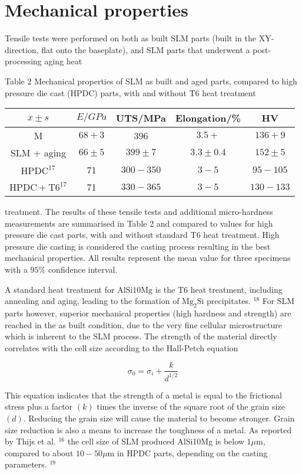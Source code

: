 \documentclass[10pt]{article}
\begin{document}
\section*{Mechanical properties}
Tensile tests were performed on both as built SLM parts (built in the XY-direction, flat onto the baseplate), and SLM parts that underwent a post-processing aging heat

Table 2 Mechanical properties of SLM as built and aged parts, compared to high pressure die cast (HPDC) parts, with and without T6 heat treatment

\begin{center}
\begin{tabular}{|c|c|c|c|c|}
\hline
$x \pm s$ & $E / G P a$ & UTS/MPa & Elongation/\% & HV \\
\hline
M & $68+3$ & 396 & $3.5+$ & $136+9$ \\
\hline
SLM + aging & $66 \pm 5$ & $399 \pm 7$ & $3.3 \pm 0.4$ & $152 \pm 5$ \\
\hline
$\mathrm{HPDC}^{17}$ & 71 & $300-350$ & $3-5$ & $95-105$ \\
\hline
$\mathrm{HPDC}+\mathrm{T} 6^{17}$ & 71 & $330-365$ & $3-5$ & $130-133$ \\
\hline
\end{tabular}
\end{center}

treatment. The results of these tensile tests and additional micro-hardness measurements are summarised in Table 2 and compared to values for high pressure die cast parts, with and without standard T6 heat treatment. High pressure die casting is considered the casting process resulting in the best mechanical properties. All results represent the mean value for three specimens with a $95 \%$ confidence interval.

A standard heat treatment for $\mathrm{AlSi} 10 \mathrm{Mg}$ is the $\mathrm{T} 6$ heat treatment, including annealing and aging, leading to the formation of $\mathrm{Mg}_{2} \mathrm{Si}$ precipitates. ${ }^{18}$ For SLM parts however, superior mechanical properties (high hardness and strength) are reached in the as built condition, due to the very fine cellular microstructure which is inherent to the SLM process. The strength of the material directly correlates with the cell size according to the Hall-Petch equation

$$
\sigma_{0}=\sigma_{i}+\frac{k}{d^{1 / 2}}
$$

This equation indicates that the strength of a metal is equal to the frictional stress plus a factor $(k)$ times the inverse of the square root of the grain size $(d)$. Reducing the grain size will cause the material to become stronger. Grain size reduction is also a means to increase the toughness of a metal. As reported by Thijs et al. ${ }^{16}$ the cell size of SLM produced AlSi10Mg is below $1 \mu \mathrm{m}$, compared to about $10-50 \mu \mathrm{m}$ in HPDC parts, depending on the casting parameters. ${ }^{19}$
\end{document}
